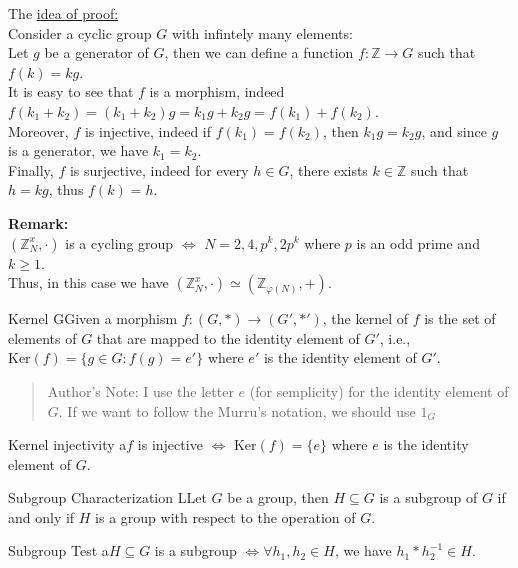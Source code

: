 \noindent
The \underline{idea of proof:}\\ 
Consider a cyclic group $G$ with infintely many elements:\\
Let $g$ be a generator of $G$, then we can define a function $f: \mathbb{Z} \to G$ such that $f(k) = kg$.\\
It is easy to see that $f$ is a morphism, indeed $f(k_1 + k_2) = (k_1 + k_2)g = k_1g + k_2g = f(k_1) + f(k_2)$.\\
Moreover, $f$ is injective, indeed if $f(k_1) = f(k_2)$, then $k_1g = k_2g$, and since $g$ is a generator, we have $k_1 = k_2$.\\
Finally, $f$ is surjective, indeed for every $h \in G$, there exists $k \in \mathbb{Z}$ such that $h = kg$, thus $f(k) = h$.\\
\bigskip    

\noindent
\textbf{Remark:}\\
$(\mathbb{Z}^x_N , \cdot)$ is a cycling group $\iff$ $N = 2, 4, p^k, 2p^k$ where $p$ is an odd prime and $k \geq 1$.\\
Thus, in this case we have $(\mathbb{Z}^x_N , \cdot) \simeq (\mathbb{Z}_{\varphi(N)}, +)$.

\bigskip

\begin{defBox}{Kernel}
    GGiven a morphism $f: (G, *) \to (G', *')$, the kernel of $f$ is the set of elements of $G$ that are mapped to the identity element of $G'$, i.e., $\text{Ker}(f) = \{ g \in G : f(g) = e' \}$ where $e'$ is the identity element of $G'$.
\end{defBox}

\begin{quote}
    Author's Note: I use the letter $e$ (for semplicity) for the identity element of $G$. If we want to follow the Murru's notation, we should use $1_G$ 
\end{quote}

\begin{propBox}{Kernel injectivity}
    a$f$ is injective $\iff$ $\text{Ker}(f) = \{ e \}$ where $e$ is the identity element of $G$.
\end{propBox}
\medskip
\begin{defBox}{Subgroup Characterization}
    LLet $G$ be a group, then $H \subseteq G$ is a subgroup of $G$ if and only if $H$ is a group with respect to the operation of $G$.
\end{defBox}

\medskip

\begin{propBox}{Subgroup Test}
    a$H \subseteq G$ is a subgroup $\iff \forall h_1, h_2 \in H$, we have $h_1 * h_2^{-1} \in H$.
\end{propBox}


